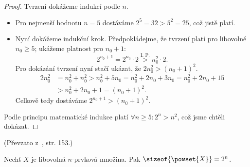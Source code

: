 \begin{proof}
    Tvrzení dokážeme indukcí podle $n$.
    \begin{itemize}
        \item Pro nejmenší hodnotu $n=5$ dostáváme $2^5=32>5^2=25$, což jistě platí.
        \item Nyní dokážeme indukční krok. Předpokládejme, že tvrzení platí pro libovolné $n_0\geq 5$; ukážeme platnost pro $n_0+1$:
        \begin{equation*}
            2^{n_0+1}=2^{n_0}\cdot 2\stackrel{\text{I. P.}}{>} n_0^2 \cdot 2.
        \end{equation*}
        Pro dokázání tvrzení nyní stačí ukázat, že $2n_0^2 > (n_0+1)^2$.
        \begin{align*}
            2n_0^2 &= n_0^2+n_0^2>n_0^2+5n_0=n_0^2+2n_0+3n_0=n_0^2+2n_0+15\\
            &>n_0^2+2n_0+1=(n_0+1)^2.
        \end{align*}
        Celkově tedy dostáváme $2^{n_0+1}>(n_0+1)^2$.
    \end{itemize}
    Podle principu matematické indukce platí $\forall n\geq 5: 2^n>n^2$, což jsme chtěli dokázat.
\end{proof}
(Převzato z~\cite{ChartrandPolimeniZhang2014}, str. 153.)
\begin{proposition}
    Nechť $X$ je libovolná $n$-prvková množina. Pak $\sizeof{\powset{X}}=2^n$.
\end{proposition}
